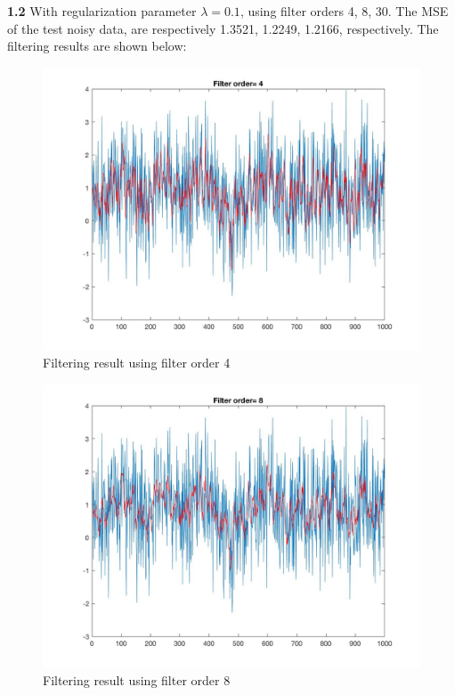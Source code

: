 \documentclass[a4paper]{article}
\begin{document}
\begin{spacing}{2.0}
\textbf{1.2} 
	With regularization parameter $\lambda = 0.1$, using filter orders 4, 8, 30. The MSE of the test noisy data, are respectively 1.3521, 1.2249, 1.2166, respectively. The filtering results are shown below:
	\begin{figure}[H]
	    \centering
	        \includegraphics[width=4.5in]{1_2_2.jpg}
	        \caption{Filtering result using filter order 4}
	        \label{fig:side:a}
	  \end{figure}
	  
	  \begin{figure}[H]
	    \centering
	        \includegraphics[width=4.5in]{1_2_3.jpg}
	        \caption{Filtering result using filter order 8}
	        \label{fig:side:a}
	  \end{figure}
	  

\end{spacing}
\end{document}
